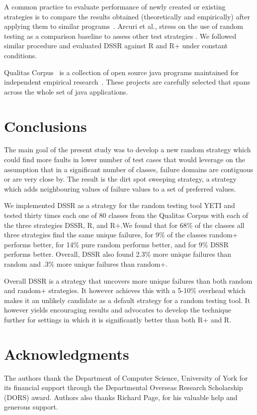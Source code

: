 \documentclass{acm_proc_article-sp}
\begin{document}
A common practice to evaluate performance of newly created or existing strategies is to compare the results obtained (theoretically and empirically) after applying them to similar programs~\cite{Gutjahr1999, Duran1984, Hamlet1990}. Arcuri et al., stress on the use of random testing as a comparison baseline to assess other test strategies \cite{Arcuri2012}. We followed similar procedure and evaluated DSSR against R and R+ under constant conditions.

Qualitas Corpus~\cite{Tempero2010} is a collection of open source java programs maintained for independent empirical research~\cite{Oriol2012, Tempero2010a, Tempero2008}. These projects are carefully selected that spans across the whole set of java applications.




\section{Conclusions}\label{sec:conc}
The main goal of the present study was to develop a new random strategy which could find more faults in lower number of test cases that would leverage on the assumption that in a significant number of classes, failure domains are contiguous or are very close by. The result is the dirt spot sweeping strategy, a strategy which adds neighbouring values of failure values to a set of preferred values. 

We implemented DSSR as a strategy for the random testing tool YETI and tested thirty times each one of 80 classes from the Qualitas Corpus with each of the three strategies DSSR, R, and R+.We found that for 68\% of the classes all three strategies find the same unique failures, for 9\% of the classes random+ performs better, for 14\% pure random performs better, and for 9\% DSSR performs better.
Overall, DSSR also found 2.3\% more unique failures than random and .3\% more unique failures than random+.

Overall DSSR is a strategy that uncovers more unique failures than both random and random+ strategies. It however achieves this with a 5-10\% overhead which makes it an unlikely candidate as a default strategy for a random testing tool. It however yields encouraging results and advocates to develop the technique further for settings in which it is significantly better than both R+ and R.

\section{Acknowledgments}
The authors thank the Department of Computer Science, University of York for its financial support through the Departmental Overseas Research Scholarship (DORS) award. Authors also thanks Richard Page, for his valuable help and generous support.
\end{document}

